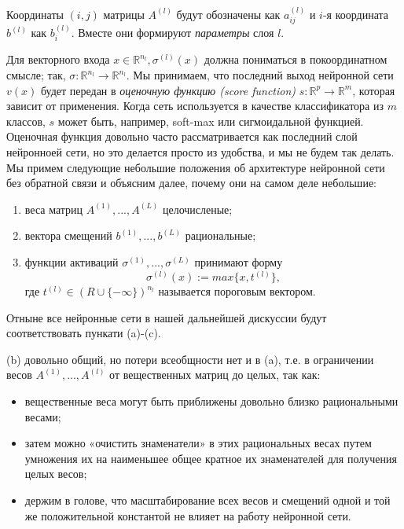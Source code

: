 \documentclass[russian]{lecture-notes}
\begin{document}
	Координаты $(i, j)$ матрицы $A^{(l)}$ будут обозначены как $a_{ij}^{(l)}$ и $i$-я координата $b^{(l)}$ как $b_{i}^{(l)}$. Вместе они формируют \textit{параметры} слоя $l$.
	
	Для векторного входа $x \in \mathbb{R}^{n_l}, \sigma^{(l)}(x)$ должна пониматься в покоординатном смысле; так, $\sigma : \mathbb{R}^{n_l} \to \mathbb{R}^{n_l}$. Мы принимаем, что последний выход нейронной сети $v(x)$ будет передан в \textit{оценочную функцию (score function)} $s : \mathbb{R}^p \to \mathbb{R}^m$, которая зависит от применения. Когда сеть используется в качестве классификатора из $m$ классов, $s$ может быть, например, soft-max или сигмоидальной функцией. Оценочная функция довольно часто рассматривается как последний слой нейронноей сети, но это делается просто из удобства, и мы не будем так делать. Мы примем следующие небольшие положения об архитектуре нейронной сети без обратной связи и объясним далее, почему они на самом деле небольшие:
	
	\begin{enumerate}[label=(\alph*)]
		\item веса матриц $A^{(1)},...,A^{(L)}$ целочисленые;
		\item вектора смещений $b^{(1)},...,b^{(L)}$ рациональные;
		\item функции активаций $\sigma^{(1)},...,\sigma^{(L)}$ принимают форму 
		\begin{equation*}
		\sigma^{(l)}(x) := max\{x,t^{(l)}\},
		\end{equation*}
		где $t^{(l)} \in (R \cup \{- \infty \})^{n_l}$ называется пороговым вектором.
	\end{enumerate}

	Отныне все нейронные сети в нашей дальнейшей дискуссии будут соответствовать пункати (a)-(c).
	
	(b) довольно общий, но потери всеобщности нет и в (a), т.е. в ограничении весов $A^{(1)},...,A^{(l)}$ от вещественных матриц до целых, так как:
	\begin{itemize}
		\item вещественные веса могут быть приближены довольно близко рациональными весами;
		\item затем можно «очистить знаменатели» в этих рациональных весах путем умножения их на наименьшее общее кратное их знаменателей для получения целых весов;
		\item держим в голове, что масштабирование всех весов и смещений одной и той же положительной константой не влияет на работу нейронной сети. 
	\end{itemize}
\end{document}
